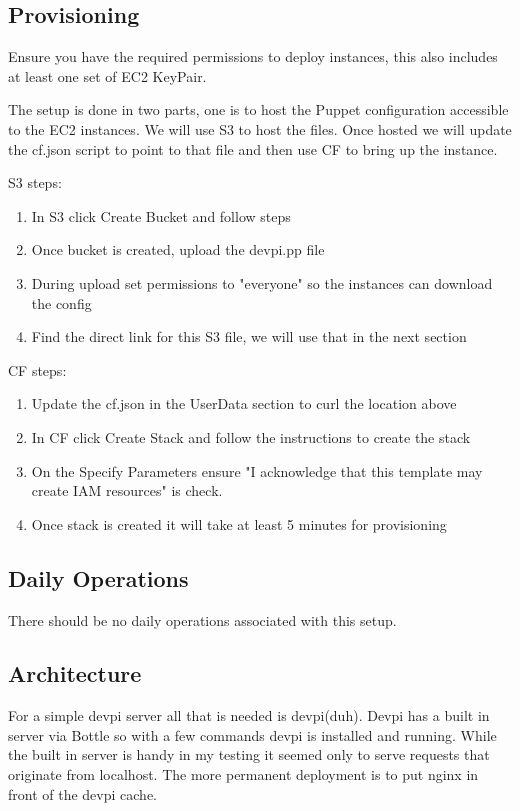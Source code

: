 \documentclass[12pt, letterpaper]{article}
\begin{document}
\subsection{Provisioning}
Ensure you have the required permissions to deploy instances, this also includes at least one set of EC2 KeyPair.

The setup is done in two parts, one is to host the Puppet configuration accessible to the EC2 instances. We will use
S3 to host the files. Once hosted we will update the cf.json script to point to that file and then use CF to bring
up the instance.

S3 steps:
\begin{enumerate}
    \item In S3 click Create Bucket and follow steps
    \item Once bucket is created, upload the devpi.pp file
    \item During upload set permissions to "everyone" so the instances can download the config
    \item Find the direct link for this S3 file, we will use that in the next section
\end{enumerate}

CF steps:
\begin{enumerate}
    \item Update the cf.json in the UserData section to curl the location above
    \item In CF click Create Stack and follow the instructions to create the stack
    \item On the Specify Parameters ensure "I acknowledge that this template may create IAM resources" is check.  
    \item Once stack is created it will take at least 5 minutes for provisioning
\end{enumerate}

\subsection{Daily Operations}
There should be no daily operations associated with this setup.


\subsection{Architecture}
For a simple devpi server all that is needed is devpi(duh). Devpi has a built in server via Bottle so with a few
commands devpi is installed and running. While the built in server is handy in my testing it seemed only to
serve requests that originate from localhost. The more permanent deployment is to put nginx in front of the
devpi cache.
\end{document}
